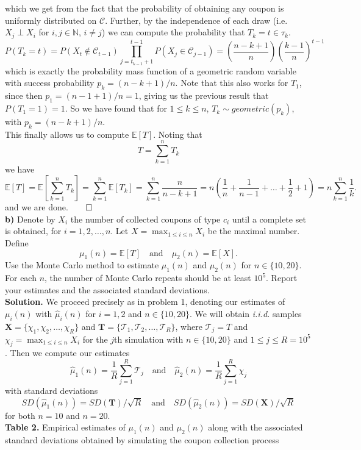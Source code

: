 \documentclass[11pt, letterpaper]{article}
\newcommand{\bs}[1]{\boldsymbol{#1}}
\newcommand{\mbb}[1]{\mathbb{#1}}
\begin{document}
    which we get from the fact that the probability of obtaining any coupon is uniformly distributed on $\mathcal{C}$. Further, by the independence of each draw (i.e. $X_j\perp X_i$ for $i,j\in\mathbb{N}$, $i\neq j$) we can compute the probability that $T_k=t\in\tau_k$.
    \[P(T_k=t)=P(X_t\notin\mathcal{C}_{t-1})\prod_{j=t_{k-1}+1}^{t-1}P(X_j\in\mathcal{C}_{j-1})=\left(\frac{n-k+1}{n}\right)\left(\frac{k-1}{n}\right)^{t-1}\] 
    which is exactly the probability mass function of a geometric random variable with success probability $p_k=(n-k+1)/n$. Note that this also works for $T_1$, since then
    $p_1=(n-1+1)/n=1$, giving us the previous result that $P(T_1=1)=1$. So we have found that for $1\leq k\leq n$, $T_k\sim geometric(p_k)$, with $p_k=(n-k+1)/n$.\\[10pt]
    This finally allows us to compute $\mbb{E}[T]$. Noting that
    \[T=\sum_{k=1}^nT_k\]
    we have
    \[\mbb{E}[T]=\mbb{E}\left[\sum_{k=1}^nT_k\right]=\sum_{k=1}^n\mbb{E}[T_k]=\sum_{k=1}^n\frac{n}{n-k+1}=n(\frac{1}{n}+\frac{1}{n-1}+\dots+\frac{1}{2}+1)=n\sum_{k=1}^n\frac{1}{k}.\]
    and we are done.\hfill{$\qed$}\\[10pt]
    {\bf b)} Denote by $X_i$ the number of collected coupons of type $c_i$ until a complete set is obtained, for $i=1,2,\dots,n$. Let $X=\max_{1\leq i\leq n}X_i$ be the maximal number. Define
    \[\mu_1(n)=\mbb{E}[T]\quad\text{and}\quad \mu_2(n)=\mbb{E}[X].\]
    Use the Monte Carlo method to estimate $\mu_1(n)$ and $\mu_2(n)$ for $n\in\{10,20\}$. For each $n$, the number of Monte Carlo repeats should be at least $10^5$. Report your estimates and the associated
    standard deviations.\\[10pt]
    {\bf Solution.} We proceed precisely as in problem 1, denoting our estimates of $\mu_i(n)$ with $\hat{\mu}_i(n)$ for $i=1,2$ and $n\in\{10,20\}$. We will obtain {\it i.i.d.} samples $\bs{X}=\{\chi_1,\chi_2,\dots,\chi_R\}$
    and $\bs{T}=\{\mathcal{T}_1,\mathcal{T}_2,\dots,\mathcal{T}_R\}$, where $\mathcal{T}_j=T$ and $\chi_j=\max_{1\leq i\leq n}X_i$ for the $j$th simulation with $n\in\{10,20\}$ and $1\leq j\leq R=10^5$. Then we compute our estimates
    \[\hat{\mu}_1(n)=\frac{1}{R}\sum_{j=1}^R\mathcal{T}_j\quad\text{and}\quad\hat{\mu}_2(n)=\frac{1}{R}\sum_{j=1}^R\chi_j\]
    with standard deviations
    \[SD(\hat{\mu}_1(n))=SD(\bs{T})/\sqrt{R}\quad\text{and}\quad SD(\hat{\mu}_2(n))=SD(\bs{X})/\sqrt{R}\]
    for both $n=10$ and $n=20$.\\[10pt]
    {\bf Table 2.} Empirical estimates of $\mu_1(n)$ and $\mu_2(n)$ along with the associated standard deviations obtained by simulating the coupon collection process
\end{document}
